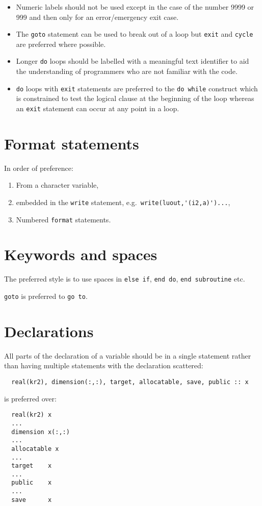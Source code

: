 \documentclass[11pt,twoside,a4paper]{report}
\begin{document}
\begin{itemize}
\item Numeric labels should not be used except in the case of the
  number 9999 or 999 and then only for an error/emergency exit case.
\item The \verb|goto| statement can be used to break out of a loop but 
  \verb|exit| and \verb|cycle| are preferred where possible.
\item Longer \verb|do| loops should be labelled with a meaningful text 
  identifier to aid the understanding of programmers who are not
  familiar with the code.
\item \verb|do| loops with \verb|exit| statements are preferred to the 
  \verb|do while| construct which is constrained to test the logical
  clause at the beginning of the loop whereas an \verb|exit| statement 
  can occur at any point in a loop.
\end{itemize}

\section{Format statements}
In order of preference:
\begin{enumerate}
\item From a character variable,
\item embedded in the \verb|write| statement, e.g.\
\verb|write(luout,'(i2,a)')...|,
\item Numbered \verb|format| statements.
\end{enumerate}

\section{Keywords and spaces}

The preferred style is to use spaces in \verb|else if|, \verb|end do|,
\verb|end subroutine| etc. 

\verb|goto| is preferred to \verb|go to|.

\section{Declarations}

All parts of the declaration of a variable should be in a single
statement rather than having multiple statements with the declaration 
scattered:
\begin{verbatim}
  real(kr2), dimension(:,:), target, allocatable, save, public :: x
\end{verbatim}
is preferred over:
\begin{verbatim}
  real(kr2) x
  ... 
  dimension x(:,:)
  ...
  allocatable x
  ...
  target    x
  ...
  public    x
  ...
  save      x
\end{verbatim}
\end{document}
